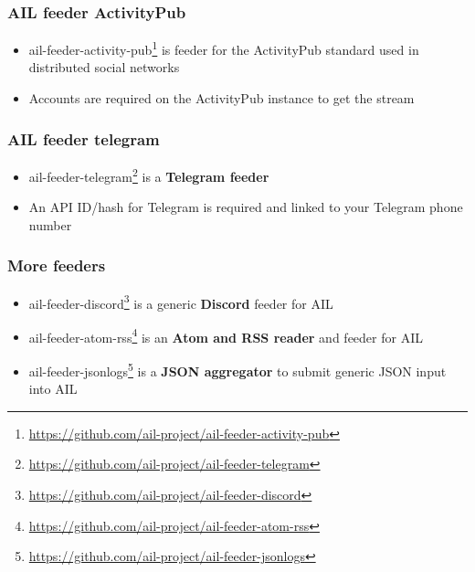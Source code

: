 \begin{frame}[fragile]
    \frametitle{AIL feeder ActivityPub}
    \begin{itemize}
        \item ail-feeder-activity-pub\footnote{\url{https://github.com/ail-project/ail-feeder-activity-pub}} is feeder for the ActivityPub standard used in distributed social networks
        \item Accounts are required on the ActivityPub instance to get the stream
    \end{itemize}
\end{frame}

\begin{frame}[fragile]
    \frametitle{AIL feeder telegram}
    \begin{itemize}
        \item ail-feeder-telegram\footnote{\url{https://github.com/ail-project/ail-feeder-telegram}} is a {\bf Telegram feeder}
        \item An API ID/hash for Telegram is required and linked to your Telegram phone number
    \end{itemize}
\end{frame}

\begin{frame}[fragile]
    \frametitle{More feeders}
    \begin{itemize}
        \item ail-feeder-discord\footnote{\url{https://github.com/ail-project/ail-feeder-discord}} is a generic {\bf Discord} feeder for AIL
        \item ail-feeder-atom-rss\footnote{\url{https://github.com/ail-project/ail-feeder-atom-rss}} is an {\bf Atom and RSS reader} and feeder for AIL   
        \item ail-feeder-jsonlogs\footnote{\url{https://github.com/ail-project/ail-feeder-jsonlogs}} is a {\bf JSON aggregator} to submit generic JSON input into AIL
    \end{itemize}
\end{frame}

